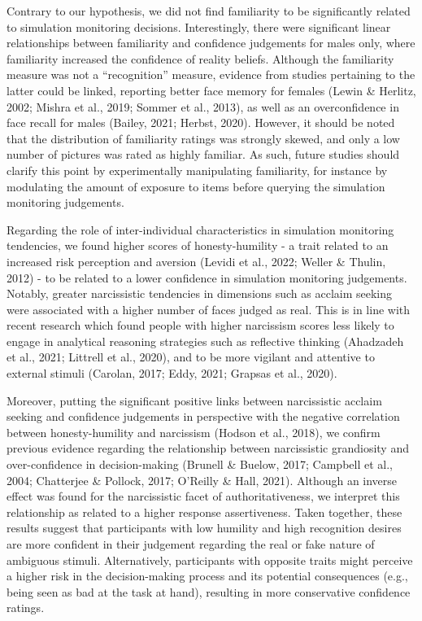 \documentclass[
  man,floatsintext]{apa6}
\begin{document}
Contrary to our hypothesis, we did not find familiarity to be significantly related to simulation monitoring decisions. Interestingly, there were significant linear relationships between familiarity and confidence judgements for males only, where familiarity increased the confidence of reality beliefs. Although the familiarity measure was not a ``recognition'' measure, evidence from studies pertaining to the latter could be linked, reporting better face memory for females (Lewin \& Herlitz, 2002; Mishra et al., 2019; Sommer et al., 2013), as well as an overconfidence in face recall for males (Bailey, 2021; Herbst, 2020). However, it should be noted that the distribution of familiarity ratings was strongly skewed, and only a low number of pictures was rated as highly familiar. As such, future studies should clarify this point by experimentally manipulating familiarity, for instance by modulating the amount of exposure to items before querying the simulation monitoring judgements.

Regarding the role of inter-individual characteristics in simulation monitoring tendencies, we found higher scores of honesty-humility - a trait related to an increased risk perception and aversion (Levidi et al., 2022; Weller \& Thulin, 2012) - to be related to a lower confidence in simulation monitoring judgements. Notably, greater narcissistic tendencies in dimensions such as acclaim seeking were associated with a higher number of faces judged as real. This is in line with recent research which found people with higher narcissism scores less likely to engage in analytical reasoning strategies such as reflective thinking (Ahadzadeh et al., 2021; Littrell et al., 2020), and to be more vigilant and attentive to external stimuli (Carolan, 2017; Eddy, 2021; Grapsas et al., 2020).

Moreover, putting the significant positive links between narcissistic acclaim seeking and confidence judgements in perspective with the negative correlation between honesty-humility and narcissism (Hodson et al., 2018), we confirm previous evidence regarding the relationship between narcissistic grandiosity and over-confidence in decision-making (Brunell \& Buelow, 2017; Campbell et al., 2004; Chatterjee \& Pollock, 2017; O'Reilly \& Hall, 2021). Although an inverse effect was found for the narcissistic facet of authoritativeness, we interpret this relationship as related to a higher response assertiveness. Taken together, these results suggest that participants with low humility and high recognition desires are more confident in their judgement regarding the real or fake nature of ambiguous stimuli. Alternatively, participants with opposite traits might perceive a higher risk in the decision-making process and its potential consequences (e.g., being seen as bad at the task at hand), resulting in more conservative confidence ratings.
\end{document}
